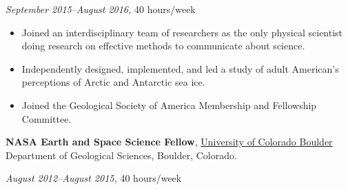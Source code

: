 \documentclass[10pt]{article}
\begin{document}
\textit{September 2015--August 2016, }  40 hours/week 

\begin{itemize}
\item Joined an interdisciplinary team of researchers as the only physical scientist doing research on effective methods to communicate about science. 
\item Independently designed, implemented, and led a study of adult American's perceptions of Arctic and Antarctic sea ice.
\item Joined the Geological Society of America Membership and Fellowship Committee.
\end{itemize} 


\textbf{NASA Earth and Space Science Fellow}, \href{http://www.colorado.edu/}{{University of Colorado Boulder}} Department of Geological Sciences, Boulder, Colorado.
	
\textit{August 2012--August 2015,} 40 hours/week 
\end{document}
